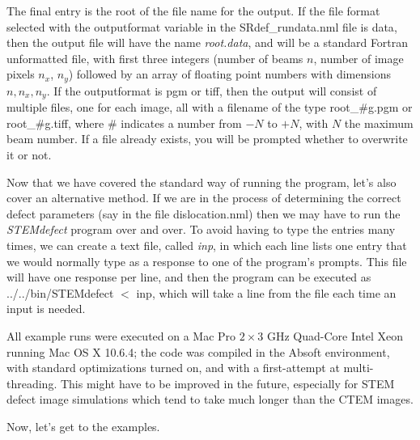 \documentclass[11pt]{article}
\begin{document}
The final entry is the root of the file name for the output.  If the file format selected with the \textsf{outputformat} variable in the \textsf{SRdef\_rundata.nml} file is 
\textsf{data}, then the output file will have the name \textit{root.data}, and will be a standard Fortran unformatted file, with first three integers (number of beams $n$, number
of image pixels $n_x$, $n_y$) followed by an array of floating point numbers with dimensions $n,n_x,n_y$.  If the \textsf{outputformat} is \textsf{pgm} or \textsf{tiff}, then the 
output will consist of multiple files, one for each image, all with a filename of the type \textsf{root\_\#g.pgm} or \textsf{root\_\#g.tiff}, where \# indicates a number from $-N$ to $+N$, with $N$ the 
maximum beam number.   If a file already exists, you will be prompted whether to overwrite it or not.

Now that we have covered the standard way of running the program, let's also cover an alternative method.  If we are in the process of determining the correct
defect parameters (say in the file \textsf{dislocation.nml}) then we may have to run the \textit{STEMdefect} program over and over.  To avoid having to type the entries 
many times, we can create a text file, called \textit{inp}, in which each line lists one entry that we would normally type as a response to one of the program's prompts.
This file will have one response per line, and then the program can be executed as \textsf{../../bin/STEMdefect $<$ inp}, which will take a line from the file each time 
an input is needed.

All example runs were executed on a Mac Pro $2\times 3$ GHz Quad-Core Intel Xeon running Mac OS X 10.6.4;  the code was compiled in the Absoft environment,
with standard optimizations turned on, and with a first-attempt at multi-threading.  This might have to be improved in the future, especially for STEM defect image simulations
which tend to take much longer than the CTEM images.

Now, let's get to the examples.
\end{document}
